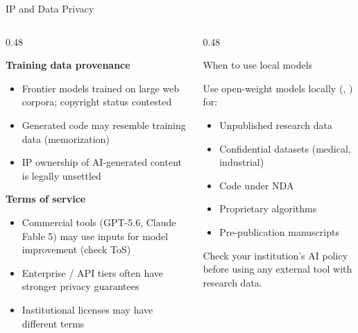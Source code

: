\begin{frame}{IP and Data Privacy}
  \begin{columns}[T, onlytextwidth]
    \begin{column}{0.48\textwidth}
      {\small
      \textbf{Training data provenance}\\[0.2em]
      \begin{itemize}
        \item Frontier models trained on large web corpora; copyright status contested
        \item Generated code may resemble training data (memorization)
        \item IP ownership of AI-generated content is legally unsettled
      \end{itemize}
      \vspace{0.3em}
      \textbf{Terms of service}\\[0.2em]
      \begin{itemize}
        \item Commercial tools (GPT-5.6, Claude Fable 5) may use inputs for model improvement (check ToS)
        \item Enterprise / API tiers often have stronger privacy guarantees
        \item Institutional licenses may have different terms
      \end{itemize}}
    \end{column}
    \hfill
    \begin{column}{0.48\textwidth}
      \begin{block}{When to use local models}
        {\small Use open-weight models locally (, ) for:
        \begin{itemize}
          \item Unpublished research data
          \item Confidential datasets (medical, industrial)
          \item Code under NDA
          \item Proprietary algorithms
          \item Pre-publication manuscripts
        \end{itemize}}
      \end{block}
      \vspace{0.3em}
      {\small\alert{Check your institution's AI policy before using any external tool with research data.}}
    \end{column}
  \end{columns}
\end{frame}

